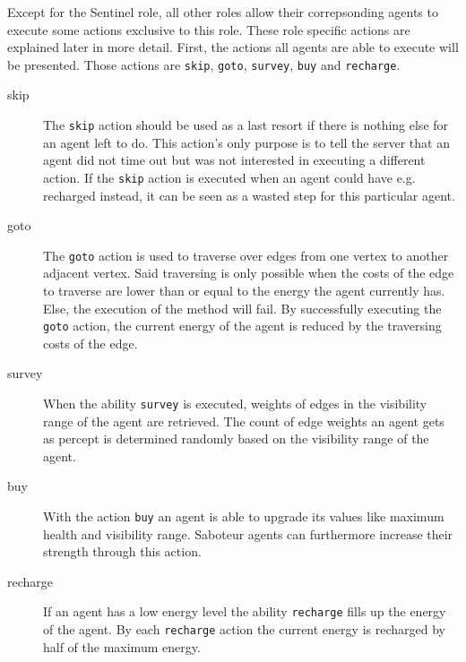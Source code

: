Except for the Sentinel role, all other roles allow their correpsonding agents to execute some actions exclusive to this role.
These role specific actions are explained later in more detail.
First, the actions all agents are able to execute will be presented.
Those actions are \texttt{skip}, \texttt{goto}, \texttt{survey}, \texttt{buy} and \texttt{recharge}.
\begin{description}
   \item[skip] The \texttt{skip} action should be used as a last resort if there is nothing else for an agent left to do.
               This action's only purpose is to tell the server that an agent did not time out but was not interested in executing a different action.
               If the \texttt{skip} action is executed when an agent could have e.g. recharged instead, it can be seen as a wasted step for this particular agent.
   \item[goto] The \texttt{goto} action is used to traverse over edges from one vertex to another adjacent vertex.
               Said traversing is only possible when the costs of the edge to traverse are lower than or equal to the energy the agent currently has.
               Else, the execution of the method will fail.
               By successfully executing the \texttt{goto} action, the current energy of the agent is reduced by the traversing costs of the edge.
   \item[survey] When the ability \texttt{survey} is executed, weights of edges in the visibility range of the agent are retrieved.
                 The count of edge weights an agent gets as percept is determined randomly based on the visibility range of the agent.
   \item[buy] With the action \texttt{buy} an agent is able to upgrade its values like maximum health and visibility range.
              Saboteur agents can furthermore increase their strength through this action.
   \item[recharge] If an agent has a low energy level the ability \texttt{recharge} fills up the energy of the agent.
                   By each \texttt{recharge} action the current energy is recharged by half of the maximum energy.
\end{description}
